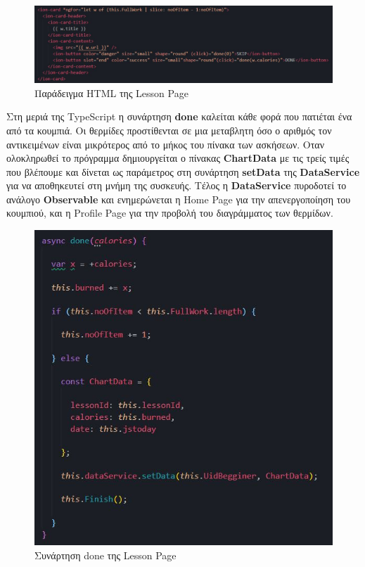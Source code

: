 \documentclass[a4paper,12pt]{article}
\begin{document}
			\begin{figure}[!htb]
				\begin{center}
					\caption{Παράδειγμα HTML της Lesson Page}
					\vspace*{0.5cm}
					\includegraphics[width=.9\linewidth]{doneHtml} 
				\end{center}  	
			\end{figure}

			\newpage
			Στη μεριά της TypeScript η συνάρτηση \textbf{done} καλείται κάθε φορά που πατιέται ένα από τα κουμπιά.
			Οι θερμίδες προστίθενται σε μια μεταβλητη όσο ο αριθμός τον αντικειμένων είναι μικρότερος από το μήκος του
			πίνακα των ασκήσεων. Οταν ολοκληρωθεί το πρόγραμμα δημιουργείται ο πίνακας \textbf{ChartData}
			με τις τρείς τιμές που βλέπουμε και δίνεται ως παράμετρος στη συνάρτηση \textbf{setData} της \textbf{DataService} για να αποθηκευτεί
			στη μνήμη της συσκευής. Τέλος η \textbf{DataService} πυροδοτεί το ανάλογο \textbf{Observable} και ενημερώνεται η Home Page για την απενεργοποίηση του κουμπιού, και
			η Profile Page για την προβολή του διαγράμματος των θερμίδων.
			\vspace{.5cm}

			\begin{figure}[!htb]
				\begin{center}
					\caption{Συνάρτηση done της Lesson Page}
					\vspace*{0.5cm}
					\includegraphics[width=.9\linewidth]{doneTS} 
				\end{center}
			\end{figure}
\end{document}
